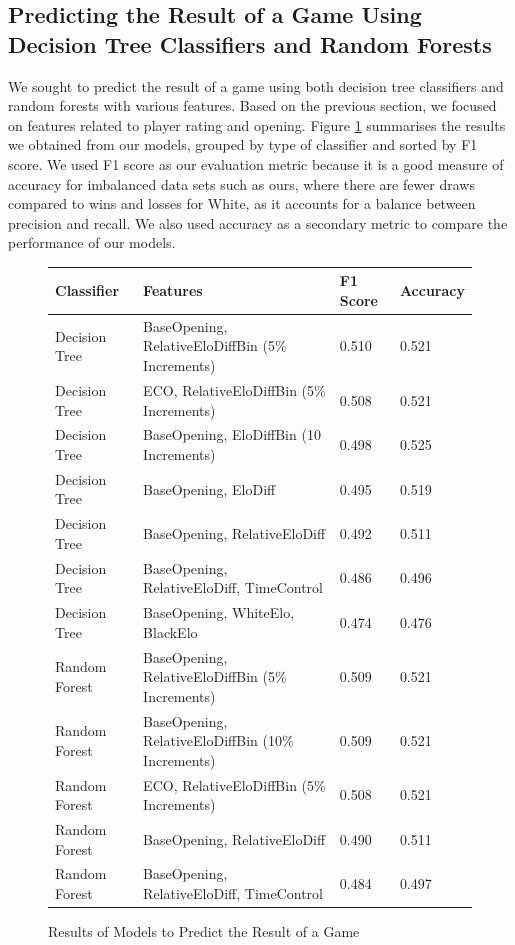 \documentclass[a4paper, 11pt]{article}
\begin{document}
\subsection{Predicting the Result of a Game Using Decision Tree Classifiers and Random Forests}
We sought to predict the result of a game using both decision tree classifiers and random forests with various features. Based on the previous section, we focused on features related to player rating and opening. Figure \ref{fig:resultsOfModelsToPredictResultOfAGame} summarises the results we obtained from our models, grouped by type of classifier and sorted by F1 score. We used F1 score as our evaluation metric because it is a good measure of accuracy for imbalanced data sets such as ours, where there are fewer draws compared to wins and losses for White, as it accounts for a balance between precision and recall. We also used accuracy as a secondary metric to compare the performance of our models.

\begin{figure}[H]
    \centering
    \caption{Results of Models to Predict the Result of a Game}
    \label{fig:resultsOfModelsToPredictResultOfAGame}
    \begin{tabular}{| l | l | l | l |} 
        \hline
        \bf{Classifier} & \bf{Features} & \bf{F1 Score} & \bf{Accuracy} \\ [0.5ex] 
        \hline
        Decision Tree & BaseOpening, RelativeEloDiffBin (5\% Increments) & 0.510 & 0.521 \\
        \hline
        Decision Tree & ECO, RelativeEloDiffBin (5\% Increments) & 0.508 & 0.521 \\
        \hline
        Decision Tree & BaseOpening, EloDiffBin (10 Increments) & 0.498 & 0.525 \\
        \hline
        Decision Tree & BaseOpening, EloDiff & 0.495 & 0.519 \\
        \hline
        Decision Tree & BaseOpening, RelativeEloDiff & 0.492 & 0.511 \\
        \hline
        Decision Tree & BaseOpening, RelativeEloDiff, TimeControl & 0.486 & 0.496 \\
        \hline
        Decision Tree & BaseOpening, WhiteElo, BlackElo & 0.474 & 0.476 \\ 
        \hline
        Random Forest & BaseOpening, RelativeEloDiffBin (5\% Increments) & 0.509 & 0.521 \\ 
        \hline
        Random Forest & BaseOpening, RelativeEloDiffBin (10\% Increments) & 0.509 & 0.521 \\ 
        \hline
        Random Forest & ECO, RelativeEloDiffBin (5\% Increments) & 0.508 & 0.521 \\ 
        \hline
        Random Forest & BaseOpening, RelativeEloDiff & 0.490 & 0.511 \\ 
        \hline
        Random Forest & BaseOpening, RelativeEloDiff, TimeControl & 0.484 & 0.497 \\ 
        \hline
    \end{tabular}
\end{figure}
\end{document}
